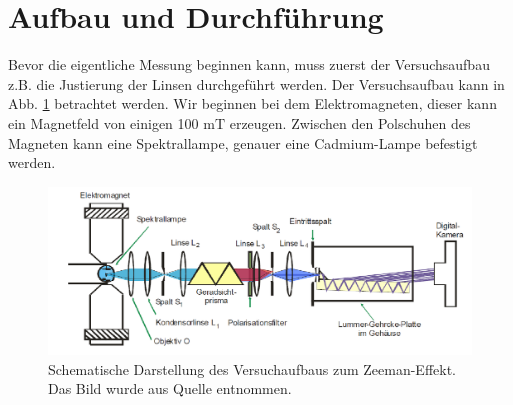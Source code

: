 \section{Aufbau und Durchführung}
\label{sec:Durchführung}


Bevor die eigentliche Messung beginnen kann, muss zuerst der Versuchsaufbau z.B. die Justierung der Linsen durchgeführt werden.
Der Versuchsaufbau kann in Abb. \ref{fig:aufbau} betrachtet werden.
Wir beginnen bei dem Elektromagneten, dieser kann ein Magnetfeld von einigen 100 $\si{\milli \tesla}$ erzeugen.
Zwischen den Polschuhen des Magneten kann eine Spektrallampe, genauer eine Cadmium-Lampe befestigt werden.

\begin{figure}
    \centering
    \includegraphics[width=\textwidth]{content/data/aufbau.png}
    \caption{Schematische Darstellung des Versuchaufbaus zum Zeeman-Effekt. Das Bild wurde aus Quelle \cite{anleitung} entnommen.} %
    \label{fig:aufbau}
\end{figure}

